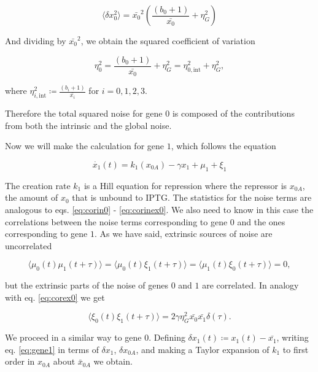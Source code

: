 \begin{equation*}
\langle \delta x_0^2 \rangle = \bar{x_0}^2\left(\frac{(b_0+1)}{\bar{x_0}}+ \eta_G^2\right)
\end{equation*}

And dividing by $\bar{x_0}^2$, we obtain the squared coefficient of variation

\begin{equation}
  \label{eq:etagene0}
  \boxed{\eta_0^2 = \frac{(b_0+1)}{\bar{x_0}}+ \eta_G^2 = \eta_{0,\text{int}}^2+\eta_G^2},
\end{equation}

where $\eta_{i,\text{int}}^2\coloneqq\frac{(b_i+1)}{\bar{x_i}}$ for $i=0,1,2,3$.

Therefore the total squared noise for gene $0$ is composed of the contributions from both the intrinsic and the global noise.

Now we will make the calculation for gene $1$, which follows the equation

\begin{equation}
\label{eq:gene1}
\dot{x_1}(t) = k_1(x_{0A})-\gamma x_1+\mu_1+\xi_1
\end{equation}

The creation rate $k_1$ is a Hill equation for repression where the repressor is $x_{0A}$, the amount of $x_0$ that is unbound to IPTG. The statistics for the noise terms are analogous to eqs. \eqref{eq:corin0} - \eqref{eq:corinex0}. We also need to know in this case the correlations between the noise terms corresponding to gene $0$ and the ones corresponding to gene $1$. As we have said, extrinsic sources of noise are uncorrelated

\begin{equation}
\label{eq:corcross01}
\langle\mu_0(t)\mu_1(t+\tau)\rangle = \langle\mu_0(t)\xi_1(t+\tau)\rangle = \langle\mu_1(t)\xi_0(t+\tau)\rangle = 0,
\end{equation}

but the extrinsic parts of the noise of genes $0$ and $1$ are correlated. In analogy with eq. \eqref{eq:corex0} we get

\begin{equation}
  \langle\xi_0(t)\xi_1(t+\tau)\rangle = 2\gamma\eta_G^2\bar{x_0}\bar{x_1}\delta(\tau).
\end{equation}

We proceed in a similar way to gene $0$. Defining $\delta x_1(t) \coloneqq x_1(t) - \bar{x_1}$, writing eq. \eqref{eq:gene1} in terms of $\delta x_1$, $\delta x_{0A}$, and making a Taylor expansion of $k_1$ to first order in $x_{0A}$ about $\bar{x}_{0A}$ we obtain.


